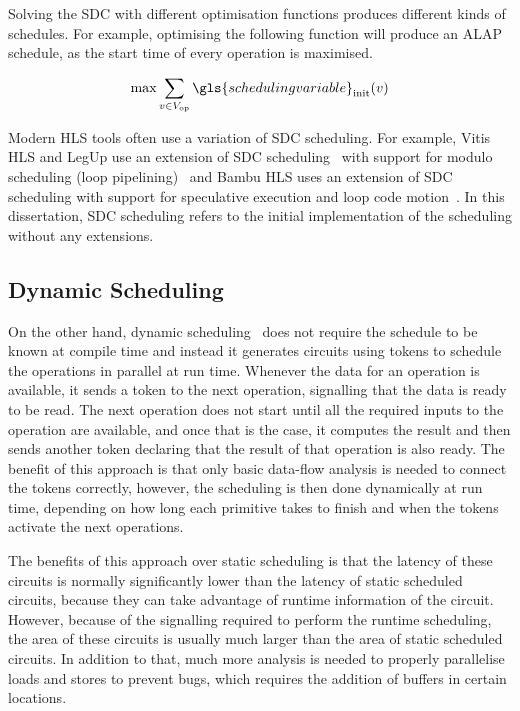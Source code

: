 Solving the \gls{SDC} with different optimisation functions produces different
kinds of schedules.  For example, optimising the following function will produce
an \gls{ALAP} schedule, as the start time of every operation is maximised.

\begin{equation*}
  \mathrm{max} \sum_{v \in V_{\mathrm{op}}} \gls{scheduling variable}_{\mathrm{init}}(v)
\end{equation*}

Modern \gls{HLS} tools often use a variation of \gls{SDC} scheduling.  For
example, Vitis HLS and LegUp use an extension of \gls{SDC}
scheduling~\cite[]{zhang13_sdc,canis14_modul_sdc} with support for modulo
scheduling (loop pipelining)~\cite[]{rau96_iterat_modul_sched} and Bambu HLS
uses an extension of \gls{SDC} scheduling with support for speculative execution
and loop code motion~\cite[]{lattuada15_ctbsss}.  In this dissertation,
\gls{SDC} scheduling refers to the initial implementation of the scheduling
without any extensions.

\subsection{Dynamic Scheduling}%
\label{sec:bg:dynamic-scheduling}

On the other hand, \gls{dynamic
  scheduling}~\cite{josipovic18_dynam_sched_high_level_synth} does not require
the schedule to be known at compile time and instead it generates circuits using
tokens to schedule the operations in parallel at run time.  Whenever the data
for an operation is available, it sends a token to the next operation,
signalling that the data is ready to be read.  The next operation does not start
until all the required inputs to the operation are available, and once that is
the case, it computes the result and then sends another token declaring that the
result of that operation is also ready.  The benefit of this approach is that
only basic data-flow analysis is needed to connect the tokens correctly,
however, the scheduling is then done dynamically at run time, depending on how
long each primitive takes to finish and when the tokens activate the next
operations.

The benefits of this approach over static scheduling is that the latency of
these circuits is normally significantly lower than the latency of static
scheduled circuits, because they can take advantage of runtime information of
the circuit.  However, because of the signalling required to perform the runtime
scheduling, the area of these circuits is usually much larger than the area of
static scheduled circuits.  In addition to that, much more analysis is needed to
properly parallelise loads and stores to prevent bugs, which requires the
addition of buffers in certain locations.

